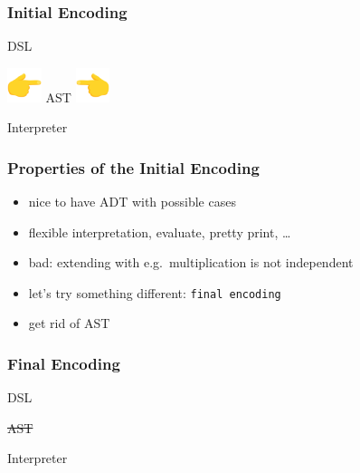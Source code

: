 \documentclass{beamer}
\begin{document}
\begin{frame}
  \frametitle{Initial Encoding}
  \begin{center}
    \Huge
    DSL
  \end{center}
  \begin{center}
    \includegraphics[width=1cm]{../pics/point_right.png}
    \Huge
    AST
    \includegraphics[width=1cm]{../pics/point_left.png}
  \end{center}
  \begin{center}
    \Huge
    Interpreter
  \end{center}
\end{frame}

\begin{frame}
  \frametitle{Properties of the Initial Encoding}
  \begin{itemize}
  \item nice to have ADT with possible cases
  \item flexible interpretation, evaluate, pretty print, \dots{}
  \item bad: extending with e.g.\ multiplication is not independent
  \item let's try something different: \texttt{final encoding}
  \item get rid of AST
  \end{itemize}
\end{frame}

\begin{frame}
  \frametitle{Final Encoding}
  \begin{center}
    \Huge
    DSL
  \end{center}
  \begin{center}
    \Huge
    \st{AST}
  \end{center}
  \begin{center}
    \Huge
    Interpreter
  \end{center}
\end{frame}
\end{document}
